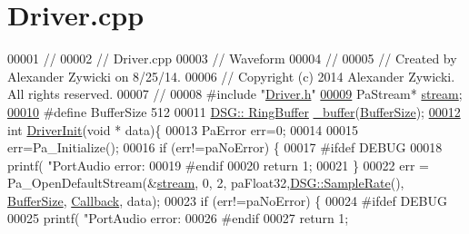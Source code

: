 \hypertarget{_driver_8cpp_source}{\section{Driver.\+cpp}
\label{_driver_8cpp_source}
}

\begin{DoxyCode}
00001 \textcolor{comment}{//}
00002 \textcolor{comment}{//  Driver.cpp}
00003 \textcolor{comment}{//  Waveform}
00004 \textcolor{comment}{//}
00005 \textcolor{comment}{//  Created by Alexander Zywicki on 8/25/14.}
00006 \textcolor{comment}{//  Copyright (c) 2014 Alexander Zywicki. All rights reserved.}
00007 \textcolor{comment}{//}
00008 \textcolor{preprocessor}{#include "\hyperlink{_driver_8h}{Driver.h}"}
\hypertarget{_driver_8cpp_source_l00009}{}\hyperlink{_driver_8cpp_aa2fbdaf8db29dee4b723a45b890cd92a}{00009} PaStream* \hyperlink{_driver_8cpp_aa2fbdaf8db29dee4b723a45b890cd92a}{stream};
\hypertarget{_driver_8cpp_source_l00010}{}\hyperlink{_driver_8cpp_aa362edf6db9662acf6ef958a6db19c35}{00010} \textcolor{preprocessor}{#define BufferSize 512}
00011 \hyperlink{class_d_s_g_1_1_ring_buffer}{DSG:: RingBuffer} \hyperlink{_driver_8cpp_acce4d24812914a6b276156d1a3d3e851}{\_buffer}(\hyperlink{_driver_8cpp_aa362edf6db9662acf6ef958a6db19c35}{BufferSize});
\hypertarget{_driver_8cpp_source_l00012}{}\hyperlink{_driver_8h_a70105fa3a575041357534257c1bd91a7}{00012} \textcolor{keywordtype}{int} \hyperlink{_driver_8cpp_a70105fa3a575041357534257c1bd91a7}{DriverInit}(\textcolor{keywordtype}{void} * data)\{
00013     PaError err=0;
00014     
00015     err=Pa\_Initialize();
00016     \textcolor{keywordflow}{if} (err!=paNoError) \{
00017 \textcolor{preprocessor}{#ifdef DEBUG}
00018         printf(  \textcolor{stringliteral}{"PortAudio error: %
00019 \textcolor{preprocessor}{#endif}
00020         \textcolor{keywordflow}{return} 1;
00021     \}
00022     err = Pa\_OpenDefaultStream(&\hyperlink{_driver_8cpp_aa2fbdaf8db29dee4b723a45b890cd92a}{stream}, 0, 2, paFloat32,\hyperlink{namespace_d_s_g_a72df05177db0412c3590070923f62819}{DSG::SampleRate}(),
      \hyperlink{_driver_8cpp_aa362edf6db9662acf6ef958a6db19c35}{BufferSize}, \hyperlink{_driver_8cpp_a110986770da2cd49dcf3789f8cc09c28}{Callback}, data);
00023     \textcolor{keywordflow}{if} (err!=paNoError) \{
00024 \textcolor{preprocessor}{#ifdef DEBUG}
00025         printf(  \textcolor{stringliteral}{"PortAudio error: %
00026 \textcolor{preprocessor}{#endif}
00027         \textcolor{keywordflow}{return} 1;
}}
\end{DoxyCode}

